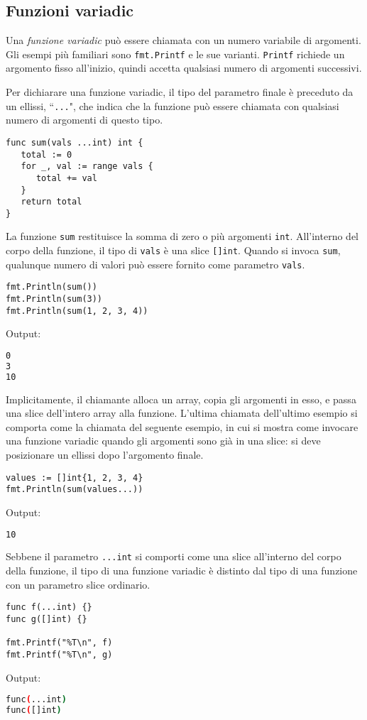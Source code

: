\documentclass[../../thesis.tex]{subfiles}
\begin{document}
    \subsection{Funzioni variadic}\label{subsec:funzioni-variadic}
    Una \textit{funzione variadic} può essere chiamata con un numero variabile di argomenti.
    Gli esempi più familiari sono \verb"fmt.Printf" e le sue varianti. \verb"Printf" richiede un argomento fisso all'inizio, quindi accetta qualsiasi numero di argomenti successivi.
    \hfill \vspace{12pt}

    Per dichiarare una funzione variadic, il tipo del parametro finale è preceduto da un ellissi, ``\verb"..."", che indica che la funzione può essere chiamata con qualsiasi numero di argomenti di questo tipo.
    \begin{lstlisting}[frame = single,label={lst:lstlisting4-7.1}]
func sum(vals ...int) int {
   total := 0
   for _, val := range vals {
      total += val
   }
   return total
}
    \end{lstlisting}
    La funzione \verb"sum" restituisce la somma di zero o più argomenti \verb"int".
    All'interno del corpo della funzione, il tipo di \verb"vals" è una slice \verb"[]int".
    Quando si invoca \verb"sum", qualunque numero di valori può essere fornito come parametro \verb"vals".
    \begin{lstlisting}[frame = single,label={lst:lstlisting4-7.2}]
fmt.Println(sum())
fmt.Println(sum(3))
fmt.Println(sum(1, 2, 3, 4))
    \end{lstlisting}
    Output:
    \begin{lstlisting}[language = bash, frame = L,label={lst:lstlisting4-7.3}]
0
3
10
    \end{lstlisting}
    Implicitamente, il chiamante alloca un array, copia gli argomenti in esso, e passa una slice dell'intero array alla funzione.
    L'ultima chiamata dell'ultimo esempio si comporta come la chiamata del seguente esempio, in cui si mostra come invocare una funzione variadic quando gli argomenti sono già in una slice: si deve posizionare un ellissi dopo l'argomento finale.
    \begin{lstlisting}[frame = single,label={lst:lstlisting4-7.4}]
values := []int{1, 2, 3, 4}
fmt.Println(sum(values...))
    \end{lstlisting}
    Output:
    \begin{lstlisting}[language = bash, frame = L,label={lst:lstlisting4-7.5}]
10
    \end{lstlisting}
    Sebbene il parametro \verb"...int" si comporti come una slice all'interno del corpo della funzione, il tipo di una funzione variadic è distinto dal tipo di una funzione con un parametro slice ordinario.
    \begin{lstlisting}[frame = single,label={lst:lstlisting4-7.6}]
func f(...int) {}
func g([]int) {}

fmt.Printf("%T\n", f)
fmt.Printf("%T\n", g)
    \end{lstlisting}
    Output:
    \begin{lstlisting}[language = bash, frame = L,label={lst:lstlisting4-7.7}]
func(...int)
func([]int)
    \end{lstlisting}
\end{document}
